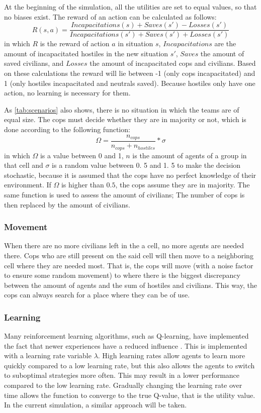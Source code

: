At the beginning of the simulation, all the utilities are set to equal values, so that no biases exist.
The reward of an action can be calculated as follows: 
$$ R(s,a) = \frac{Incapacitations(s) + Saves(s') - Losses(s')}{Incapacitations(s') + Saves(s') + Losses(s')}$$
in which $R$ is the reward of action $a$ in situation $s$, $Incapacitations$ are the amount of incapacitated hostiles in the new situation $s'$, $Saves$ the amount of saved civilians, and $Losses$ the amount of incapacitated cops and civilians.
Based on these calculations the reward will lie between -1 (only cops incapacitated) and 1 (only hostiles incapacitated and neutrals saved).
Because hostiles only have one action, no learning is necessary for them.


As \autoref{tab:scenarios} also shows, there is no situation in which the teams are of equal size.
The cops must decide whether they are in majority or not, which is done according to the following function:
$$ \Omega = \frac{n_{cops}}{n_{cops} + n_{hostiles}}*\sigma $$
in which $\Omega$ is a value between 0 and 1, $n$ is the amount of agents of a group in that cell and $\sigma$ is a random value between 0.
5 and 1.
5 to make the decision stochastic, because it is assumed that the cops have no perfect knowledge of their environment.
If $\Omega$ is higher than $0.
5$, the cops assume they are in majority.
The same function is used to assess the amount of civilians; The number of cops is then replaced by the amount of civilians.

\subsubsection{Movement}
When there are no more civilians left in the a cell, no more agents are needed there.
Cops who are still present on the said cell will then move to a neighboring cell where they are needed most.
That is, the cops will move (with a noise factor to ensure some random movement) to where there is the biggest discrepancy between the amount of agents and the sum of hostiles and civilians.
This way, the cops can always search for a place where they can be of use.

\subsubsection{Learning}
Many reinforcement learning algorithms, such as Q-learning, have implemented the fact that newer experiences have a reduced influence  \citep*{watkins1992q}.
This is implemented with a learning rate variable $\lambda$.
High learning rates allow agents to learn more quickly compared to a low learning rate, but this also allows the agents to switch to suboptimal strategies more often.
This may result in a lower performance compared to the low learning rate.
Gradually changing the learning rate over time allows the function to converge to the true Q-value, that is the utility value.
In the current simulation, a similar approach will be taken.



